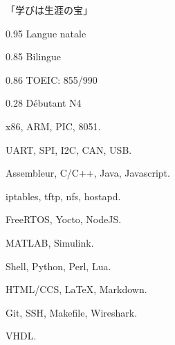 \documentclass{faresume}
\begin{document}
\begin{column}[\rightcolumnwidth]


		\addcontent
		{
			{\Large\begin{CJK}{UTF8}{min}「学びは生涯の宝」\end{CJK}}
		}{}{}{}{}


		{}{}{}{}

		{}{}{}{}

		{}{}{}{}

		{}{}{}{}	


			{0.95}
			{Langue natale}
			{}{}{}

			{0.85}
			{Bilingue}
			{}{}{}

			{0.86}
			{TOEIC: 855/990}
			{}{}{}

			{0.28}
			{D\'ebutant N4}
			{}{}{}


			{x86, ARM, PIC, 8051.}
			{}{}{}{}

			{UART, SPI, I2C, CAN, USB.}
			{}{}{}{}

			{Assembleur, C/C++, Java, Javascript.}
			{}{}{}{}
        
			{iptables, tftp, nfs, hostapd.}
			{}{}{}{}

			{FreeRTOS, Yocto, NodeJS.}
			{}{}{}{}

			{MATLAB, Simulink.}
			{}{}{}{}

			{Shell, Python, Perl, Lua.}
			{}{}{}{}

			{HTML/CCS, {\LaTeX}, Markdown.}
			{}{}{}{}

			{Git, SSH, Makefile, Wireshark.}
			{}{}{}{}

			{VHDL.}
			{}{}{}{}



\end{column}
\end{document}
